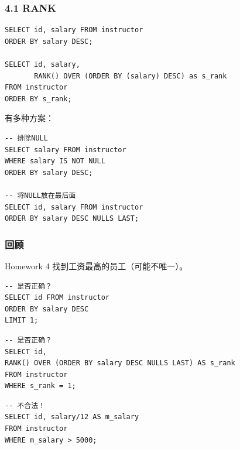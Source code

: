 \documentclass[aspectratio=169, 14pt]{beamer}
\begin{document}
\begin{frame}[fragile]
    \frametitle{4.1 RANK}

    \begin{verbatim}
SELECT id, salary FROM instructor
ORDER BY salary DESC;

SELECT id, salary, 
       RANK() OVER (ORDER BY (salary) DESC) as s_rank
FROM instructor
ORDER BY s_rank;
    \end{verbatim}    

    \pause

\end{frame}

\begin{frame}[fragile]

有多种方案：
\begin{verbatim}
-- 排除NULL
SELECT salary FROM instructor
WHERE salary IS NOT NULL
ORDER BY salary DESC;

-- 将NULL放在最后面
SELECT id, salary FROM instructor
ORDER BY salary DESC NULLS LAST;
\end{verbatim}       

\end{frame}

\begin{frame}[fragile]
    \frametitle{回顾}
\begin{exampleblock}{Homework 4}
找到工资最高的员工（可能不唯一）。    
\end{exampleblock}
    
\begin{verbatim}
-- 是否正确？
SELECT id FROM instructor
ORDER BY salary DESC
LIMIT 1;
\end{verbatim}

\end{frame}

\begin{frame}[fragile]

    \begin{verbatim}
-- 是否正确？
SELECT id,
RANK() OVER (ORDER BY salary DESC NULLS LAST) AS s_rank
FROM instructor
WHERE s_rank = 1;
    \end{verbatim}

    \pause

    \begin{verbatim}
-- 不合法！
SELECT id, salary/12 AS m_salary
FROM instructor
WHERE m_salary > 5000;
    \end{verbatim}

\end{frame}
\end{document}
